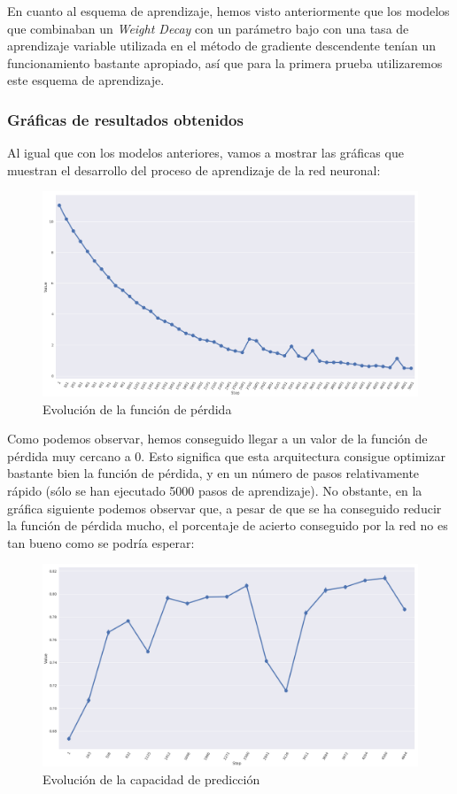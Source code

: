 \documentclass[11pt]{article}
\theoremstyle{plain}
\theoremstyle{definition}
\begin{document}
En cuanto al esquema de aprendizaje, hemos visto anteriormente que los
modelos que combinaban un \textit{Weight Decay} con un parámetro
bajo con una tasa de aprendizaje variable utilizada en el método de
gradiente descendente tenían un funcionamiento bastante apropiado, así
que para la primera prueba utilizaremos este esquema de aprendizaje.

\subsubsection{Gráficas de resultados obtenidos}

Al igual que con los modelos anteriores, vamos a mostrar las gráficas
que muestran el desarrollo del proceso de aprendizaje de la red
neuronal:

\begin{figure}[H]
  \centering \includegraphics[width=.95\textwidth]{imgs/loss_2conv}
  \caption{Evolución de la función de pérdida}
\end{figure}

Como podemos observar, hemos conseguido llegar a un valor de la
función de pérdida muy cercano a 0. Esto significa que esta
arquitectura consigue optimizar bastante bien la función de pérdida, y
en un número de pasos relativamente rápido (sólo se han ejecutado 5000
pasos de aprendizaje).  No obstante, en la gráfica siguiente podemos
observar que, a pesar de que se ha conseguido reducir la función de
pérdida mucho, el porcentaje de acierto conseguido por la red no es
tan bueno como se podría esperar:

\begin{figure}[H]
  \centering
  \includegraphics[width=.95\textwidth]{imgs/accuracy_2conv}
  \caption{Evolución de la capacidad de predicción}
\end{figure}
\end{document}

